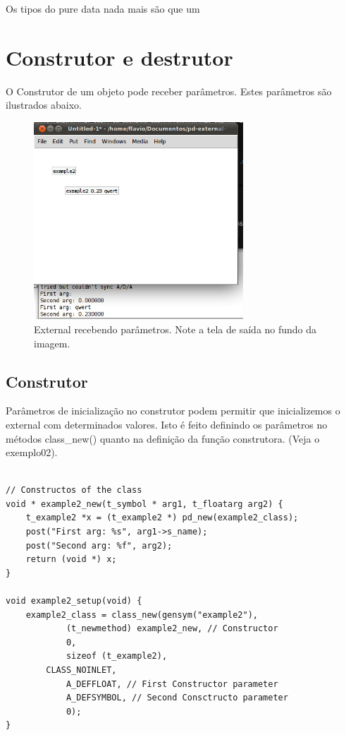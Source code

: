 \documentclass[10pt,a4paper]{report}
\begin{document}
Os tipos do pure data nada mais são que um


\chapter{Construtor e destrutor}

O Construtor de um objeto pode receber parâmetros. Estes parâmetros são ilustrados abaixo.

\begin{figure}[h!]
	\centering
	\includegraphics[width=0.7\textwidth]{example2}
	\caption{External recebendo parâmetros. Note a tela de saída no fundo da imagem.}
\end{figure}

\section{Construtor}

Parâmetros de inicialização no construtor podem permitir que inicializemos o external com determinados valores. Isto é feito definindo os parâmetros no métodos class\_new() quanto na definição da função construtora. (Veja o exemplo02).

\begin{lstlisting}

// Constructos of the class
void * example2_new(t_symbol * arg1, t_floatarg arg2) {
    t_example2 *x = (t_example2 *) pd_new(example2_class);
    post("First arg: %s", arg1->s_name);
    post("Second arg: %f", arg2);
    return (void *) x;
}

void example2_setup(void) {
    example2_class = class_new(gensym("example2"),
            (t_newmethod) example2_new, // Constructor
            0,
            sizeof (t_example2),
	    CLASS_NOINLET,
            A_DEFFLOAT, // First Constructor parameter
            A_DEFSYMBOL, // Second Consctructo parameter
            0);
}
\end{lstlisting}
\end{document}

